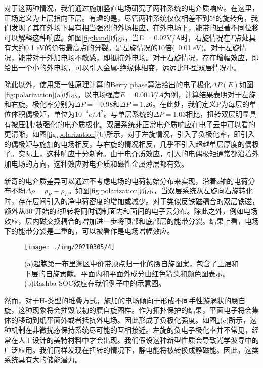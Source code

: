 \documentclass[reprint, aps, prb, showkeys]{revtex4-2}
\begin{document}
对于这两种情况，我们通过施加竖直电场研究了两种系统的电介质响应。在这里，正场定义为上层指向下层。有趣的是，尽管两种系统仅仅相差不到5°的旋转角，我们发现了其在外场下具有相当强烈的外场相应，在外电场下，能带的显著不同位移可以解释这种响应。如图\ref{fig:band}所示，当E = 0.02V/A时，右旋情况在$\Gamma$点处具有大约0.1 eV的价带最高点的分裂。是左旋情况的10倍(~0.01 eV)。对于左旋情况，能带对于外加电场不敏感，即抵抗外电场。对于右旋情况，存在增幅效应，即给出一个小的外电场，可以引入金属-绝缘体相变，远远比H-型双层情况小。

除此以外，使用第一性原理计算的Berry phase算法给出的电子极化$\Delta P(E)$如图\ref{fig:polarization}(a)所示。以电场强度$E = 0.001 V/A$为例，计算结果表明对于左旋和右旋，极化率分别为$\Delta P = -0.98$和$\Delta P = 1.26$。在此处，我们定义P为每层的单位体积偶极矩，单位为$10^{-4} e/A^2$。与单层系统的$\Delta P = 1.03$相比，扭转双层明显具有被压制/被强化的电介质极化。双层系统非正常电介质响应在电子云中可以看的更清晰，如图\ref{fig:polarization}(b)所示，对于左旋情况，引入了负极化率，即引入的偶极矩与施加的电场相反，与右旋的情况相反，几乎不引入超越单层厚度的偶极子。实际上，这种响应十分新奇。由于电介质效应，引入的电偶极矩通常都沿着外加电场的方向，这种效应对电介质和磁性金属薄层都有效。

新奇的电介质差异可以通过不考虑电场的电荷初始分布来实现，沿着z轴的电荷分布不均$\Delta\rho = \rho_R - \rho_L$。如图\ref{fig:polarization}所示，当双层系统从左旋向右旋转化时，存在层间引入的净电荷密度的增加或减少。对于类似反铁磁耦合的双层铁磁，额外从30°开始的$\delta$扭转将同时调制面内和面间的电子云分布。除此之外，例如电场效应，层内磁交换耦合的增加进一步将顶部和底部层的能带分裂。结果上看，电场下的能带分裂是二重的，可以被看作是电场增幅效应。

\begin{figure}[b]
    \texttt{[image: ./img/20210305/4]}
    \caption{\label{fig:pseudospin} 
    (a)超胞第一布里渊区中价带顶点归一化的赝自旋图案，包含了上层和下层的自旋贡献。平面内和平面外成分由红色箭头和颜色图表示。(b)Rashba SOC效应在我们例子中的示意图。
    }
\end{figure}

然而，对于H-类型的堆叠方式，施加的电场倾向于形成不同手性漩涡状的赝自旋，这种现象将会摧毁最初的赝自旋图样。作为拓扑保护的结果，平面电子将会集体的移动到纸平面外或者抵抗外电场。因此形成了负极化强度。如图\ref{fig:pseudospin}(c)所示，这种机制在非微扰态保持系统尽可能的互相接近。左旋的负电子极化率并不常见，经常在人工设计的美特材料中才会出现。我们假设这种新型性质会导致光学波导中的广泛应用。我们同样发现在扭转的情况下，静电能将被转换成静磁能。因此，这类系统具有大的储能潜力。
\end{document}
